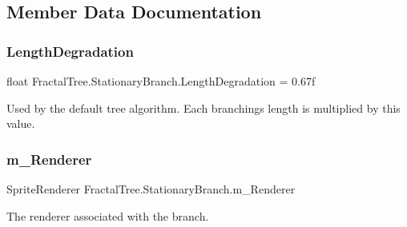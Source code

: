 \subsection{Member Data Documentation}
\hypertarget{class_fractal_tree_1_1_stationary_branch_a406e104be242fe61b1c1c1ea7d67f167}{}\label{class_fractal_tree_1_1_stationary_branch_a406e104be242fe61b1c1c1ea7d67f167} 
\subsubsection{\texorpdfstring{Length\+Degradation}{LengthDegradation}}
{\footnotesize\ttfamily float Fractal\+Tree.\+Stationary\+Branch.\+Length\+Degradation = 0.\+67f\hspace{0.3cm}{\ttfamily [static]}}



Used by the default tree algorithm. Each branchings length is multiplied by this value. 

\hypertarget{class_fractal_tree_1_1_stationary_branch_a395acf767c2156a0f203d00322e71512}{}\label{class_fractal_tree_1_1_stationary_branch_a395acf767c2156a0f203d00322e71512} 
\subsubsection{\texorpdfstring{m\+\_\+\+Renderer}{m\_Renderer}}
{\footnotesize\ttfamily Sprite\+Renderer Fractal\+Tree.\+Stationary\+Branch.\+m\+\_\+\+Renderer\hspace{0.3cm}{\ttfamily [protected]}}



The renderer associated with the branch. 

\hypertarget{class_fractal_tree_1_1_stationary_branch_ad29fc34a0ab42c6bf44277d38816c568}{}\label{class_fractal_tree_1_1_stationary_branch_ad29fc34a0ab42c6bf44277d38816c568} 
